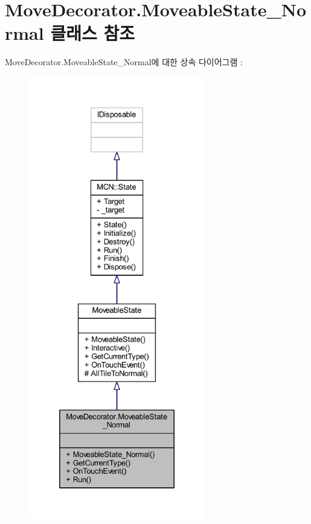 \hypertarget{class_move_decorator_1_1_moveable_state___normal}{}\section{Move\+Decorator.\+Moveable\+State\+\_\+\+Normal 클래스 참조}
\label{class_move_decorator_1_1_moveable_state___normal}


Move\+Decorator.\+Moveable\+State\+\_\+\+Normal에 대한 상속 다이어그램 \+: 
\nopagebreak
\begin{figure}[H]
\begin{center}
\leavevmode
\includegraphics[height=550pt]{class_move_decorator_1_1_moveable_state___normal__inherit__graph}
\end{center}
\end{figure}


